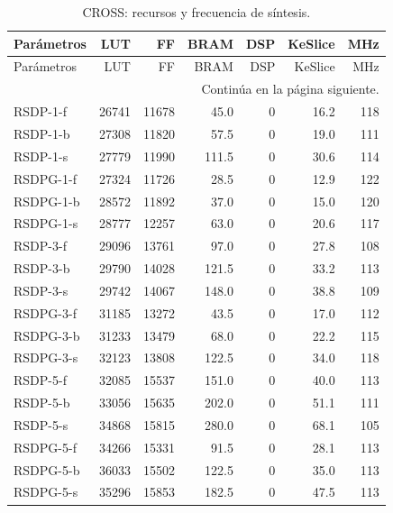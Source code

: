 \begingroup
\small
\setlength{\tabcolsep}{3pt}
\setlength{\LTcapwidth}{\textwidth}
\begin{longtable}{lrrrrrr}
\caption{CROSS: recursos y frecuencia de síntesis.}\label{tab:eval-cross-recursos}\\
\toprule
Parámetros & LUT & FF & BRAM & DSP & KeSlice & MHz \\
\midrule
\endfirsthead
\toprule
Parámetros & LUT & FF & BRAM & DSP & KeSlice & MHz \\
\midrule
\endhead
\midrule
\multicolumn{7}{r}{\small Continúa en la página siguiente.}\\
\endfoot
\bottomrule
\endlastfoot
{RSDP-1-f} & {26741} & {11678} & {45.0} & {0} & {16.2} & {118} \\
{RSDP-1-b} & {27308} & {11820} & {57.5} & {0} & {19.0} & {111} \\
{RSDP-1-s} & {27779} & {11990} & {111.5} & {0} & {30.6} & {114} \\
{RSDPG-1-f} & {27324} & {11726} & {28.5} & {0} & {12.9} & {122} \\
{RSDPG-1-b} & {28572} & {11892} & {37.0} & {0} & {15.0} & {120} \\
{RSDPG-1-s} & {28777} & {12257} & {63.0} & {0} & {20.6} & {117} \\
{RSDP-3-f} & {29096} & {13761} & {97.0} & {0} & {27.8} & {108} \\
{RSDP-3-b} & {29790} & {14028} & {121.5} & {0} & {33.2} & {113} \\
{RSDP-3-s} & {29742} & {14067} & {148.0} & {0} & {38.8} & {109} \\
{RSDPG-3-f} & {31185} & {13272} & {43.5} & {0} & {17.0} & {112} \\
{RSDPG-3-b} & {31233} & {13479} & {68.0} & {0} & {22.2} & {115} \\
{RSDPG-3-s} & {32123} & {13808} & {122.5} & {0} & {34.0} & {118} \\
{RSDP-5-f} & {32085} & {15537} & {151.0} & {0} & {40.0} & {113} \\
{RSDP-5-b} & {33056} & {15635} & {202.0} & {0} & {51.1} & {111} \\
{RSDP-5-s} & {34868} & {15815} & {280.0} & {0} & {68.1} & {105} \\
{RSDPG-5-f} & {34266} & {15331} & {91.5} & {0} & {28.1} & {113} \\
{RSDPG-5-b} & {36033} & {15502} & {122.5} & {0} & {35.0} & {113} \\
{RSDPG-5-s} & {35296} & {15853} & {182.5} & {0} & {47.5} & {113} \\
\end{longtable}

